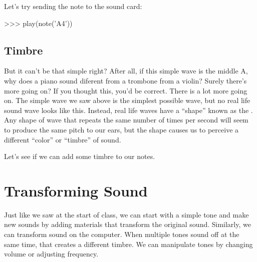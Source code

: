 Let's try sending the note to the sound card:
\begin{replbox}
>>> play(note('A4'))
\end{replbox}

\subsection{Timbre}

But it can't be that simple right? After all, if this simple wave is the middle A, why does a piano
sound diferent from a trombone from a violin? Surely there's more going on? If you thought this,
you'd be correct. There is a lot more going on. The simple wave we saw above is the simplest
possible wave, but no
real life sound wave looks like this. Instead, real life waves have a ``shape'' known as the
. Any shape of wave that repeats the same number of times per second will seem to produce the
same pitch to our ears, but the shape causes us to perceive a different ``color'' or ``timbre'' of
sound.

Let's see if we can add some timbre to our notes.

\section{Transforming Sound}

Just like we saw at the start of class, we can start with a simple tone and make new sounds by
adding materials that transform the original sound. Similarly, we can transform sound on the
computer. When multiple tones sound off at the same time, that creates a different timbre. We can
manipulate tones by changing volume or adjusting frequency.


